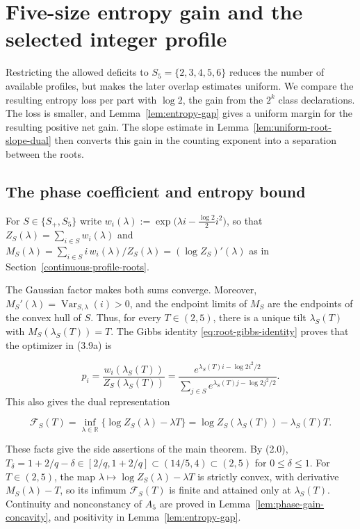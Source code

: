 \documentclass[a4paper,10pt,reqno]{amsart}
\numberwithin{equation}{section}
\theoremstyle{plain}
\theoremstyle{remark}
\begin{document}
\section{Five-size entropy gain and the selected integer profile}\label{the-five-size-signed-first-moment-advantage}

Restricting the allowed deficits to \(S_5=\{2,3,4,5,6\}\) reduces the
number of available profiles, but makes the later overlap estimates uniform.
We compare the resulting entropy loss per part with \(\log 2\), the gain from
the \(2^k\) class declarations. The loss is smaller, and
Lemma~\ref{lem:entropy-gap} gives a uniform margin for the resulting
positive net gain. The slope estimate
in Lemma~\ref{lem:uniform-root-slope-dual} then converts this gain in the
counting exponent into a separation between the roots.

\subsection{The phase coefficient and entropy bound}
For $S\in\{S_+,S_5\}$ write
$w_i(\lambda):=\exp\bigl(\lambda i-\frac{\log 2}{2}i^2\bigr)$, so that
$Z_S(\lambda)=\sum_{i\in S}w_i(\lambda)$ and
$M_S(\lambda)=\sum_{i\in S}i\,w_i(\lambda)/Z_S(\lambda)=(\log Z_S)'(\lambda)$
as in Section~\ref{continuous-profile-roots}.

The Gaussian factor makes both sums converge. Moreover,
\(M_S'(\lambda)=\operatorname{Var}_{S,\lambda}(i)>0\), and the endpoint
limits of \(M_S\) are the endpoints of the convex hull of \(S\). Thus, for
every \(T\in(2,5)\), there is a unique tilt
\(\lambda_S(T)\) with \(M_S(\lambda_S(T))=T\). The Gibbs identity \eqref{eq:root-gibbs-identity}
proves that the optimizer in (3.9a) is

\[
 p_i=\frac{w_i(\lambda_S(T))}{Z_S(\lambda_S(T))}
 =\frac{e^{\lambda_S(T)i-{\log 2}i^2/2}}
        {\sum_{j\in S}e^{\lambda_S(T)j-{\log 2}j^2/2}}.       \tag{5.1}
\]
This also gives the dual representation

\[
 \mathcal F_S(T)
 =\inf_{\lambda\in\mathbb R}
   \{\log Z_S(\lambda)-\lambda T\}
 =\log Z_S(\lambda_S(T))-\lambda_S(T)T.
\]

These facts give the side assertions of the main theorem. By (2.0),
$T_\delta=1+2/q-\delta\in[2/q,1+2/q]\subset(14/5,4)\subset(2,5)$ for
$0\le\delta\le1$. For $T\in(2,5)$, the map
$\lambda\mapsto\log Z_S(\lambda)-\lambda T$ is strictly convex, with
derivative $M_S(\lambda)-T$, so its infimum $\mathcal F_S(T)$ is finite and
attained only at $\lambda_S(T)$. Continuity and nonconstancy of $A_5$ are
proved in Lemma~\ref{lem:phase-gain-concavity}, and positivity in
Lemma~\ref{lem:entropy-gap}.
\end{document}
